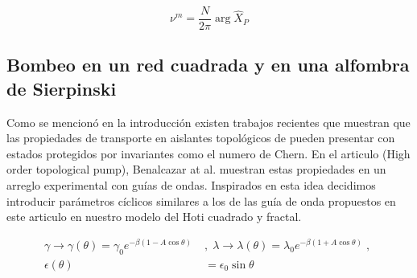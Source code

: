 \begin{equation}
\label{eq:Wannier_center}
    \nu^m = \frac{N}{2\pi} \; \text{arg} \; \hat{X}_P
\end{equation}





\subsection{Bombeo en un red cuadrada y en una alfombra de Sierpinski}


Como se mencionó en la introducción existen trabajos recientes que muestran que las propiedades de transporte en aislantes topológicos de pueden presentar con estados protegidos por invariantes como el numero de Chern. En el articulo (High order topological pump), Benalcazar at al. muestran estas propiedades en un arreglo experimental con guías de ondas. Inspirados en esta idea decidimos introducir parámetros cíclicos similares a los de las guía de onda propuestos en este articulo en nuestro modelo del Hoti cuadrado y fractal.

\begin{align}
    \nonumber\gamma \rightarrow \gamma (\theta) = \gamma_0 e^{\displaystyle-\beta(1 - A \cos \theta )} \; &,\;  \lambda \rightarrow \lambda(\theta) = \lambda_0 e^{\displaystyle-\beta( 1 + A \cos \theta )} \;,\; \\  \epsilon(\theta) &= \epsilon_0 \sin \theta
\end{align}



